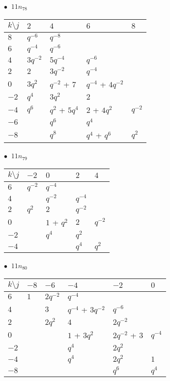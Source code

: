 \begin{minipage}{\linewidth}
$\bullet\ $ $11n_{78}$ \vspace{0.5em} \\
\begin{tabular}{l|llll}
$k \setminus j$ & $2$ & $4$ & $6$ & $8$ \\
\hline
$8$ & $q^{-6}$ & $q^{-8}$ &  &  \\
$6$ & $q^{-4}$ & $q^{-6}$ &  &  \\
$4$ & $3q^{-2}$ & $5q^{-4}$ & $q^{-6}$ &  \\
$2$ & $2$ & $3q^{-2}$ & $q^{-4}$ &  \\
$0$ & $3q^{2}$ & $q^{-2}$ + $7$ & $q^{-4}$ + $4q^{-2}$ &  \\
$-2$ & $q^{4}$ & $3q^{2}$ & $2$ &  \\
$-4$ & $q^{6}$ & $q^{2}$ + $5q^{4}$ & $2$ + $4q^{2}$ & $q^{-2}$ \\
$-6$ &  & $q^{6}$ & $q^{4}$ &  \\
$-8$ &  & $q^{8}$ & $q^{4}$ + $q^{6}$ & $q^{2}$ \\
\end{tabular}
\vspace{2em}
\end{minipage}
%
\begin{minipage}{\linewidth}
$\bullet\ $ $11n_{79}$ \vspace{0.5em} \\
\begin{tabular}{l|llll}
$k \setminus j$ & $-2$ & $0$ & $2$ & $4$ \\
\hline
$6$ & $q^{-2}$ & $q^{-4}$ &  &  \\
$4$ &  & $q^{-2}$ & $q^{-4}$ &  \\
$2$ & $q^{2}$ & $2$ & $q^{-2}$ &  \\
$0$ &  & $1$ + $q^{2}$ & $2$ & $q^{-2}$ \\
$-2$ &  & $q^{4}$ & $q^{2}$ &  \\
$-4$ &  &  & $q^{4}$ & $q^{2}$ \\
\end{tabular}
\vspace{2em}
\end{minipage}
%
\begin{minipage}{\linewidth}
$\bullet\ $ $11n_{80}$ \vspace{0.5em} \\
\begin{tabular}{l|lllll}
$k \setminus j$ & $-8$ & $-6$ & $-4$ & $-2$ & $0$ \\
\hline
$6$ & $1$ & $2q^{-2}$ & $q^{-4}$ &  &  \\
$4$ &  & $3$ & $q^{-4}$ + $3q^{-2}$ & $q^{-6}$ &  \\
$2$ &  & $2q^{2}$ & $4$ & $2q^{-2}$ &  \\
$0$ &  &  & $1$ + $3q^{2}$ & $2q^{-2}$ + $3$ & $q^{-4}$ \\
$-2$ &  &  & $q^{4}$ & $2q^{2}$ &  \\
$-4$ &  &  & $q^{4}$ & $2q^{2}$ & $1$ \\
$-8$ &  &  &  & $q^{6}$ & $q^{4}$ \\
\end{tabular}
\vspace{2em}
\end{minipage}
